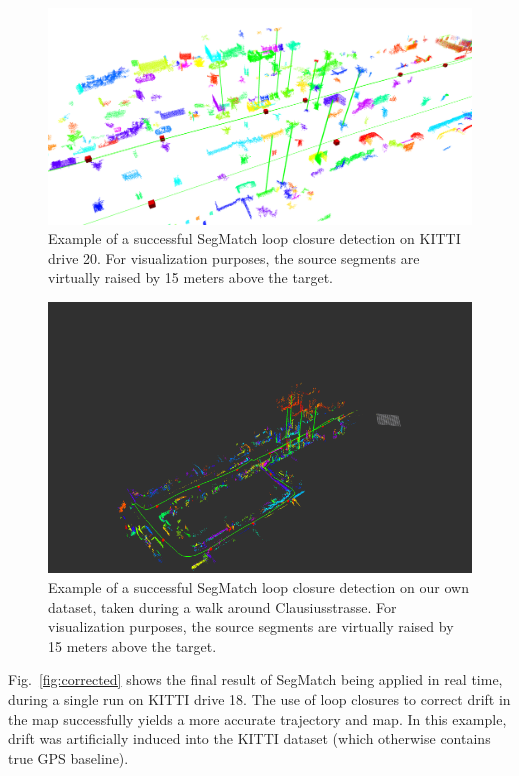 \begin{figure}
  \centering
  \includegraphics[width=5.2in]{images/segmatchae.png}
  \caption{Example of a successful SegMatch loop closure detection on KITTI drive 20. For visualization purposes, the source segments are virtually raised by 15 meters above the target.}
  \label{fig:segmatch-loop-closure}
\end{figure}

\begin{figure}
  \centering
  \includegraphics[width=5.2in]{images/clausius2.png}
  \caption{Example of a successful SegMatch loop closure detection on our own dataset, taken during a walk around Clausiusstrasse. For visualization purposes, the source segments are virtually raised by 15 meters above the target.}
  \label{fig:clausius2}
\end{figure}

Fig.~\ref{fig:corrected} shows the final result of SegMatch being applied in real time, during a single run on KITTI drive 18. The use of loop closures to correct drift in the map successfully yields a more accurate trajectory and map. In this example, drift was artificially induced into the KITTI dataset (which otherwise contains true GPS baseline).\\

